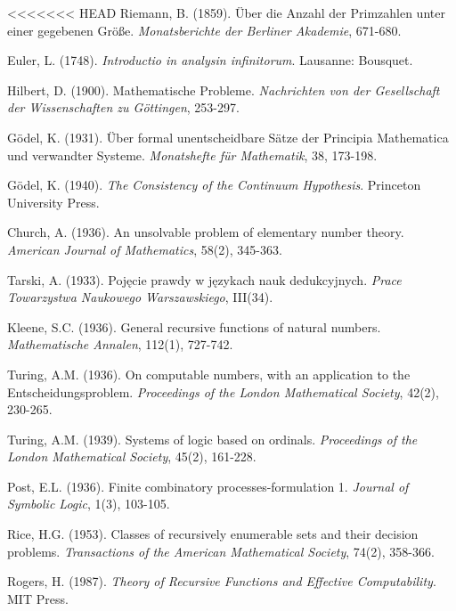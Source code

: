 \documentclass[12pt]{article}
\theoremstyle{plain}
\theoremstyle{definition}
\begin{document}
\begin{thebibliography}{99}

<<<<<<< HEAD
 Riemann, B. (1859). Über die Anzahl der Primzahlen unter einer gegebenen Größe. \emph{Monatsberichte der Berliner Akademie}, 671-680.

 Euler, L. (1748). \emph{Introductio in analysin infinitorum}. Lausanne: Bousquet.

 Hilbert, D. (1900). Mathematische Probleme. \emph{Nachrichten von der Gesellschaft der Wissenschaften zu Göttingen}, 253-297.

 Gödel, K. (1931). Über formal unentscheidbare Sätze der Principia Mathematica und verwandter Systeme. \emph{Monatshefte für Mathematik}, 38, 173-198.

 Gödel, K. (1940). \emph{The Consistency of the Continuum Hypothesis}. Princeton University Press.

 Church, A. (1936). An unsolvable problem of elementary number theory. \emph{American Journal of Mathematics}, 58(2), 345-363.

 Tarski, A. (1933). Pojęcie prawdy w językach nauk dedukcyjnych. \emph{Prace Towarzystwa Naukowego Warszawskiego}, III(34).

 Kleene, S.C. (1936). General recursive functions of natural numbers. \emph{Mathematische Annalen}, 112(1), 727-742.

 Turing, A.M. (1936). On computable numbers, with an application to the Entscheidungsproblem. \emph{Proceedings of the London Mathematical Society}, 42(2), 230-265.

 Turing, A.M. (1939). Systems of logic based on ordinals. \emph{Proceedings of the London Mathematical Society}, 45(2), 161-228.

 Post, E.L. (1936). Finite combinatory processes-formulation 1. \emph{Journal of Symbolic Logic}, 1(3), 103-105.

 Rice, H.G. (1953). Classes of recursively enumerable sets and their decision problems. \emph{Transactions of the American Mathematical Society}, 74(2), 358-366.

 Rogers, H. (1987). \emph{Theory of Recursive Functions and Effective Computability}. MIT Press.


\end{thebibliography}
\end{document}
